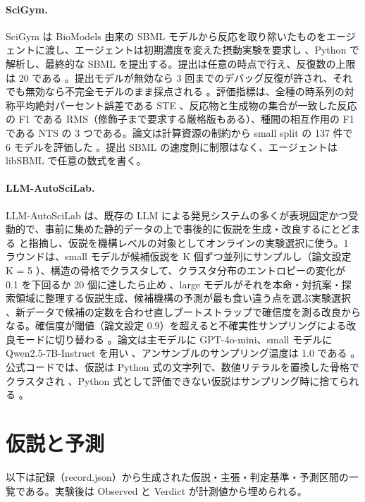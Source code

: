 \documentclass{article}
\begin{document}
\paragraph{SciGym.}
SciGym \citep{duan-2025-measuring} は BioModels 由来の SBML モデルから反応を取り除いたものをエージェントに渡し、エージェントは初期濃度を変えた摂動実験を要求し \cite[s1.p4]{duan-2025-measuring}、Python で解析し、最終的な SBML を提出する。提出は任意の時点で行え、反復数の上限は 20 である \cite[s1.p1]{duan-2025-measuring}。提出モデルが無効なら 3 回までのデバッグ反復が許され、それでも無効なら不完全モデルのまま採点される \cite[s1.p2]{duan-2025-measuring}。評価指標は、全種の時系列の対称平均絶対パーセント誤差である STE \cite[s1.p5]{duan-2025-measuring}、反応物と生成物の集合が一致した反応の F1 である RMS（修飾子まで要求する厳格版もある）\cite[s1.p6]{duan-2025-measuring}、種間の相互作用の F1 である NTS \cite[s1.p7]{duan-2025-measuring} の 3 つである。論文は計算資源の制約から small split の 137 件で 6 モデルを評価した \cite[s1.p9]{duan-2025-measuring}。提出 SBML の速度則に制限はなく、エージェントは libSBML で任意の数式を書く。

\paragraph{LLM-AutoSciLab.}
LLM-AutoSciLab \citep{kabra-2026-llm} は、既存の LLM による発見システムの多くが表現固定かつ受動的で、事前に集めた静的データの上で事後的に仮説を生成・改良するにとどまる \cite[s2.p3]{kabra-2026-llm} と指摘し、仮説を機構レベルの対象としてオンラインの実験選択に使う。1 ラウンドは、small モデルが候補仮説を K 個ずつ並列にサンプルし（論文設定 K = 5 \cite[s2.p9]{kabra-2026-llm}）、構造の骨格でクラスタして、クラスタ分布のエントロピーの変化が 0.1 を下回るか 20 個に達したら止め \cite[s2.p10]{kabra-2026-llm}、large モデルがそれを本命・対抗案・探索領域に整理する仮説生成、候補機構の予測が最も食い違う点を選ぶ実験選択 \cite[s2.p6]{kabra-2026-llm}、新データで候補の定数を合わせ直しブートストラップで確信度を測る改良からなる。確信度が閾値（論文設定 0.9）を超えると不確実性サンプリングによる改良モードに切り替わる \cite[s2.p12]{kabra-2026-llm}。論文は主モデルに GPT-4o-mini、small モデルに Qwen2.5-7B-Instruct を用い \cite[s2.p4]{kabra-2026-llm}、アンサンブルのサンプリング温度は 1.0 である \cite[s2.p13]{kabra-2026-llm}。公式コードでは、仮説は Python 式の文字列で、数値リテラルを置換した骨格でクラスタされ \cite[s2.p28]{kabra-2026-llm}、Python 式として評価できない仮説はサンプリング時に捨てられる \cite[s2.p29]{kabra-2026-llm}。

\section{仮説と予測}
\label{sec:hypothesis}
以下は記録（record.json）から生成された仮説・主張・判定基準・予測区間の一覧である。実験後は Observed と Verdict が計測値から埋められる。
\end{document}
